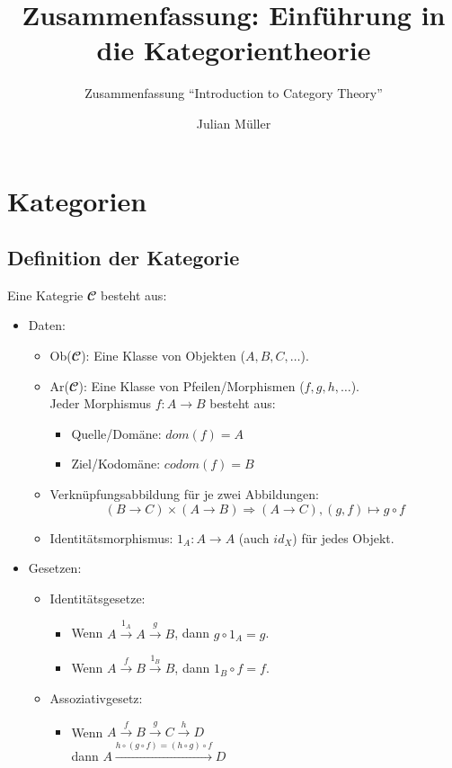 \documentclass[parskip=half]{scrreprt}
\begin{document}
\title{Zusammenfassung: Einführung in die Kategorientheorie}
\subtitle{Zusammenfassung \enquote{Introduction to Category Theory}}
\author{Julian Müller}
\maketitle
\tableofcontents

\part{Kategorien}

\chapter{Definition der Kategorie}

\begin{definition}[Kategorie]
Eine Kategrie $𝓒$ besteht aus:
\begin{itemize}[leftmargin=1em]
\item Daten: 
	\begin{itemize}
	\item Ob($𝓒$): Eine Klasse von Objekten ($A, B, C, \dots$).
	\item Ar($𝓒$): Eine Klasse von Pfeilen/Morphismen ($f, g, h, \dots$). \\
		Jeder Morphismus $f : A → B$ besteht aus:
		\begin{itemize}
		\item Quelle/Domäne: $dom(f) = A$
		\item Ziel/Kodomäne: $codom(f) = B$
		\end{itemize}
	\item Verknüpfungsabbildung für je zwei Abbildungen:
		$$(B → C) × (A → B) ⇒ (A → C), (g,f) ↦ g ∘ f$$
	\item Identitätsmorphismus: $1_A : A → A$ (auch $id_X$) für jedes Objekt.
	\end{itemize}
\item Gesetzen:
	\begin{itemize}
	\item Identitätsgesetze:
		\begin{itemize}
		\item Wenn $A \xrightarrow{1_A} A \xrightarrow{g} B$, dann $g ∘ 1_A = g$.
		\item Wenn $A \xrightarrow{f} B \xrightarrow{1_B} B$, dann $1_B ∘ f = f$.
		\end{itemize}
	\item Assoziativgesetz:
		\begin{itemize}
		\item Wenn $A \xrightarrow{f} B \xrightarrow{g} C \xrightarrow{h} D$\\ 
			dann $A \xrightarrow{h∘(g∘f)=(h∘g)∘f} D $
		\end{itemize}
	\end{itemize}
\end{itemize}
\end{definition}
\end{document}
